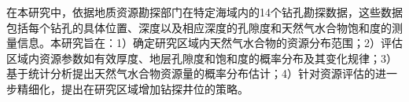 
\setlength{\parindent}{2em} 
在本研究中，依据地质资源勘探部门在特定海域内的14个钻孔勘探数据，这些数据包括每个钻孔的具体位置、深度以及相应深度的孔隙度和天然气水合物饱和度的测量信息。本研究旨在：1）确定研究区域内天然气水合物的资源分布范围；2）评估区域内资源参数如有效厚度、地层孔隙度和饱和度的概率分布及其变化规律；3）基于统计分析提出天然气水合物资源量的概率分布估计；4）针对资源评估的进一步精细化，提出在研究区域增加钻探井位的策略。